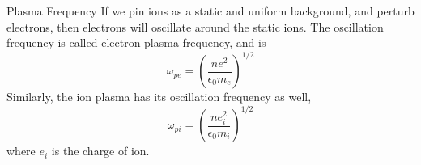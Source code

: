 \begin{frame}{Plasma Frequency}
    If we pin ions as a static and uniform background, and perturb electrons, then electrons will oscillate around the static ions. The oscillation frequency is called electron plasma frequency, and is
    \begin{equation}
        \omega_{pe} = \left(\frac{ne^2}{\epsilon_0m_e}\right)^{1/2}
        \label{eq:electron-plasma-frequency}
    \end{equation}
    Similarly, the ion plasma has its oscillation frequency as well,
    \begin{equation}
        \omega_{pi} = \left(\frac{ne_i^2}{\epsilon_0m_i}\right)^{1/2}
        \label{eq:electron-plasma-frequency}
    \end{equation}
    where $e_i$ is the charge of ion.
\end{frame}